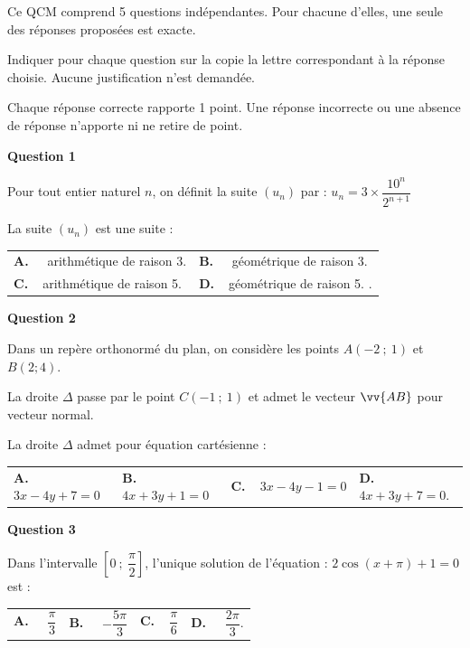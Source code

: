 \medskip

Ce QCM comprend 5 questions indépendantes. Pour chacune d'elles, une seule des réponses
proposées est exacte.

Indiquer pour chaque question sur la copie la lettre correspondant à la réponse choisie.
Aucune justification n'est demandée.

Chaque réponse correcte rapporte 1 point. Une réponse incorrecte ou une absence de
réponse n'apporte ni ne retire de point.

\medskip

\textbf{Question 1}

\medskip 

Pour tout entier naturel $n$, on définit la suite $\left(u_n\right)$ par : $u_n= 3 \times \dfrac{10^n}{2^{n+1}}$

La suite $\left(u_n\right)$ est une suite :

\begin{tabularx}{\linewidth}{*{2}{X}}
\textbf{A.~~} arithmétique de
raison 3.&\textbf{B.~~} géométrique de
raison 3.\\\textbf{C.~~}arithmétique de
raison 5.& \textbf{D.~~}géométrique de
raison 5. .
\end{tabularx}

\medskip

\textbf{Question 2}

\medskip 

Dans un repère orthonormé \Oij{} du plan, on considère les points $A(-2~;~ 1)$ et $B(2; 4)$.

La droite $\Delta$ passe par le point $C(-1~;~1)$ et admet le vecteur $\vv{AB}$ pour vecteur normal.

La droite $\Delta$ admet pour équation cartésienne :

\medskip

\begin{tabularx}{\linewidth}{*{4}{X}}
\textbf{A.~~} $3x - 4y + 7 = 0$ &\textbf{B.~~} $ 4x + 3y + 1 = 0$&\textbf{C.~~}$ 3x - 4y - 1 = 0$& \textbf{D.~~} $4x + 3y + 7 = 0$.
\end{tabularx}

\medskip

\textbf{Question 3}

\medskip 

Dans l'intervalle $\left[0~;~\dfrac{\pi}{2}\right]$, l'unique solution de l'équation : $2\cos (x + \pi) + 1 = 0$ est :

\begin{tabularx}{\linewidth}{*{4}{X}}
\textbf{A.~~} $\dfrac{\pi}{3}$ &\textbf{B.~~} $-\dfrac{5\pi}{3}$&\textbf{C.~~}$\dfrac{\pi}{6}$& \textbf{ D.~~} $\dfrac{2\pi}{3}$.
\end{tabularx}

